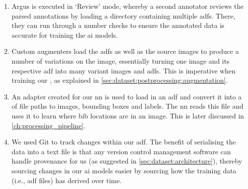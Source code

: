 \begin{enumerate}
  \item Argus is executed in `Review' mode, whereby a second annotator reviews the parsed annotations by loading a directory containing multiple \glspl{adf}. There, they can run through a number checks to ensure the annotated data is accurate for training the \gls{ai} models.
  \item Custom augmenters load the \glspl{adf} as well as the source images to produce a number of variations on the image, essentially turning one image and its respective \gls{adf} into many variant images and \glspl{adf}. This is imperative when training our , as explained in \cref{sec:dataset:postprocessing:augmentation}.
  \item An adapter created for our \gls{nn} is used to load in an \gls{adf} and convert it into a  of file paths to images, bounding boxes and labels. The \gls{nn} reads this file and uses it to learn where bib locations are in an image. This is later discussed in \cref{ch:processing_pipeline}.
  \item We used Git to track changes within our \gls{adf}. The benefit of serialising the data into a text file is that any version control management software can handle provenance for us (as suggested in \cref{sec:dataset:architecture}), thereby sourcing changes in our \gls{ai} models easier by sourcing how the training data (i.e., \gls{adf} files) has derived over time.
\end{enumerate}





